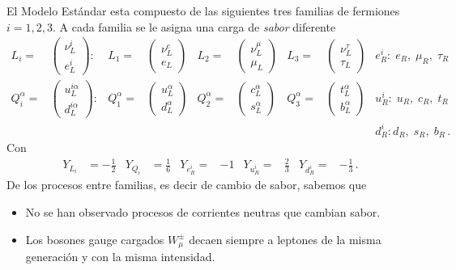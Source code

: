 \begin{frame}
El Modelo Estándar esta compuesto de las siguientes tres familias de fermiones $i=1,2,3$. A cada familia se le asigna una carga de \emph{sabor} diferente
\begin{align}
L_i=&
\begin{pmatrix}
  \nu^i_L\\
  e^i_L
\end{pmatrix}:&
  L_1=&
  \begin{pmatrix}
    \nu^e_L\\
    e_L
  \end{pmatrix}&  L_2=&
  \begin{pmatrix}
    \nu^\mu_L\\
    \mu_L
  \end{pmatrix}&  L_3=&
  \begin{pmatrix}
    \nu^\tau_L\\
    \tau_L
  \end{pmatrix}& e_R^i:\;e_R,\;\mu_R,\;\tau_R\nonumber\\
Q_i^\alpha=&
\begin{pmatrix}
  u^{i\alpha}_L\\
  d^{i\alpha}_L
\end{pmatrix}:&
  Q_1^\alpha=&
  \begin{pmatrix}
    u^\alpha_L\\
    d^\alpha_L
  \end{pmatrix}&  Q_2^\alpha=&
  \begin{pmatrix}
    c^\alpha_L\\
    s^\alpha_L
  \end{pmatrix}&  Q_3^\alpha=&
  \begin{pmatrix}
    t^\alpha_L\\
    b^\alpha_L
  \end{pmatrix}& u_R^i:\;u_R,\;c_R,\;t_R\nonumber\\
&&&&&&&&d_R^i:d_R,\;s_R,\;b_R\,.
\end{align}
Con
\begin{align}
  Y_{L_i}&=-\frac{1}{2}&Y_{Q_i}&=\frac{1}{6}& Y_{e_R^i}=&-1&
Y_{u_R^i}=&\frac{2}{3}&Y_{d_R^i}=&-\frac{1}{3}\,.
\end{align}
De los procesos entre familias, es decir de cambio de sabor, sabemos que

\begin{itemize} %
\item No se han observado procesos de corrientes neutras que cambian sabor.
\item Los bosones gauge cargados $W_\mu^\pm$ decaen siempre a leptones de la misma generación y con la misma intensidad.
\end{itemize} %



\end{frame}

